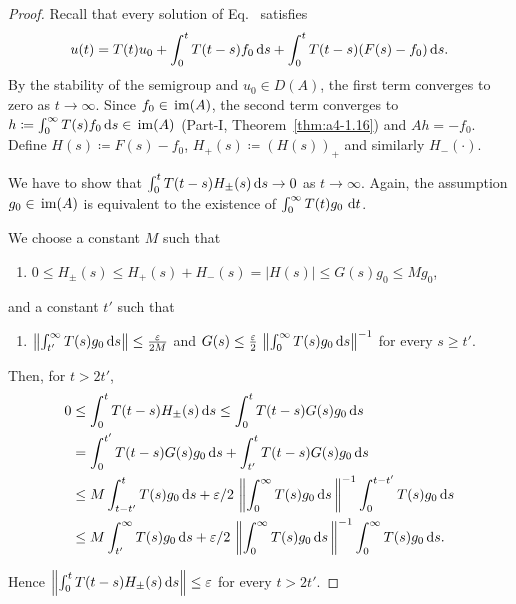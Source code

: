 \begin{proof}
Recall that every solution of Eq.~ satisfies
\begin{equation}\label{eq:c4-1.7}
u(t) = T(t)u_0 + \int_{0}^{t} T(t-s)f_{0} \mathop{}\!\mathrm{d}{s} + \int_{0}^{t} T(t-s)(F(s) - f_{0}) \mathop{}\!\mathrm{d}{s}.
\end{equation}
By the stability of the semigroup and $u_0 \in D(A)$, the first term converges to zero as $t \to \infty$.
Since $f_{0} \in \mathop{}\mathrm{im}(A)$, the second term converges to $h \coloneqq  \int_{0}^{\infty} T(s)f_{0} \mathop{}\!\mathrm{d}{s} \in \mathop{}\mathrm{im}(A)$ (Part-I, Theorem~\ref{thm:a4-1.16}) and $Ah = -f_{0}$.
Define $H(s) \coloneqq F(s) - f_{0}$, 
$ H_{+}(s) \coloneqq (H(s))_{+} $ 
and similarly $H_{-}(\cdot)$.

We have to show that $\int_{0}^{t} T(t-s)H_{\pm}(s) \mathop{}\!\mathrm{d}{s} \to 0$ as $t \to \infty$.
Again, the assumption $g_{0} \in \mathop{}\mathrm{im}(A)$ is equivalent to the existence of\/ $\int_{0}^{\infty} T(t)g_{0} \, \mathop{}\!\mathrm{d}{t}$.

We choose a constant $M$  such that 
\begin{enumerate}[\upshape (i)]
    \item 
    $0 \leq H_{\pm}(s) \leq H_{+}(s) + H_{-}(s) = |H(s)| \leq G(s)g_{0} \leq Mg_{0}$,
\end{enumerate}
and a constant $t'$ such that
\begin{enumerate}
    \item $ \left\|\int_{t'}^{\infty} T(s)g_{0} \ds\right\| \leq \frac{\epsilon}{2M}$ and  
$G(s) \leq \frac{\epsilon}{2} \,  \left\|\int_{0}^{\infty} T(s)g_{0} \ds\right\|^{-1}$ for every $s \geq t'$.
\end{enumerate}
Then, for $t > 2t'$,
\begin{align*}
	0 &\leq \int_{0}^{t} T(t-s)H_{\pm}(s) \ds \leq \int_{0}^{t} T(t-s)G(s)g_{0} \ds\\
	&= \int_{0}^{t'} T(t-s)G(s)g_{0} \ds + \int_{t'}^{t} T(t-s)G(s)g_{0} \ds\\
	&\leq M \int_{t-t'}^{t} T(s)g_{0} \ds + \epsilon/2 \,  \left\|\int_{0}^{\infty} T(s)g_{0} \ds\, \right\|^{-1} \int_{0}^{t-t'} T(s)g_{0} \ds\\
	&\leq M \int_{t'}^{\infty} T(s)g_{0} \ds + \epsilon/2 \,  \left\|\int_{0}^{\infty} T(s)g_{0} \ds\, \right\|^{-1} \int_{0}^{\infty} T(s)g_{0} \ds.
\end{align*}

Hence $\left\|\int_{0}^{t} T(t-s)H_{\pm}(s) \ds\right\| \leq \epsilon$ for every $t > 2t'$.
\end{proof}
